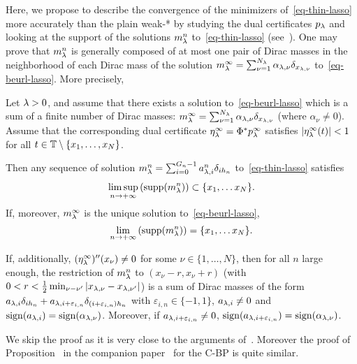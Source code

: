 Here, we propose to describe the convergence of the minimizers of~\eqref{eq-thin-lasso} more accurately than the plain weak-* by studying the dual certificates $p_\lambda$ and looking at the support of the solutions $m_\lambda^n$ to~\eqref{eq-thin-lasso} (see~\cite[Section~5.4]{2013-duval-sparsespikes}). One may prove that $m_\lambda^n$ is generally composed of at most one pair of Dirac masses in the neighborhood of each Dirac mass of the solution $m_{\lambda}^\infty=\sum_{\nu=1}^{N_\lambda} \alpha_{\lambda,\nu}\delta_{x_{\lambda,\nu}}$ to~\eqref{eq-beurl-lasso}. More precisely, 
\begin{prop}
  Let $\lambda >0$, and assume that there exists a solution to~\eqref{eq-beurl-lasso} which is a sum of a finite number of Dirac masses: $m_{\lambda}^\infty=\sum_{\nu=1}^{N_\lambda} \alpha_{\lambda,\nu}\delta_{x_{\lambda,\nu}}$ (where $\alpha_\nu\neq 0$). Assume that the corresponding dual certificate $\eta_\lambda^{\infty}=\Phi^*p_{\lambda}^\infty$ satisfies $|\eta_\lambda^\infty(t)|<1$ for all $t\in \mathbb{T}\setminus \{x_1,\ldots ,x_N \}$.
    
  Then any sequence of solution $m_{\lambda}^n=\sum_{i=0}^{{G_n}-1} a^n_{\lambda,i} \delta_{i{h_n}}$ to~\eqref{eq-thin-lasso} satisfies 
  \begin{align*}
    \limsup_{n\to+\infty}\left(\operatorname{supp}(m_{\lambda}^n)\right)\subset \{x_1, \ldots x_N\}.
  \end{align*}
  If, moreover, $m_{\lambda}^\infty$ is the unique solution to~\eqref{eq-beurl-lasso}, 
  \begin{align}
    \lim_{n\to+\infty}\left(\operatorname{supp}(m_{\lambda}^n)\right)= \{x_1, \ldots x_N\}.
  \end{align}

  If, additionally, $(\eta_\lambda^{\infty})''(x_\nu)\neq 0$ for some $\nu \in\{1,\ldots,N\}$, then for all $n$ large enough, the restriction of $m_{\lambda}^{n}$ to $(x_\nu-r,x_\nu+r)$ (with $0<r<\frac{1}{2} \min_{\nu-\nu'}|x_{\lambda,\nu}-x_{\lambda,\nu'}|$) is a sum of Dirac masses of the form $ a_{\lambda,i}\delta_{i{h_n}}+ a_{\lambda,i+\varepsilon_{i,n}}\delta_{(i+\varepsilon_{i,n}){h_n}}$ with $\varepsilon_{i,n}\in\{-1,1\}$, $a_{\lambda,i}\neq 0$ and $\operatorname{sign}(a_{\lambda,i})=\operatorname{sign}(\alpha_{\lambda,\nu})$. Moreover, if $a_{\lambda,i+\varepsilon_{i,n}}\neq 0$, $\operatorname{sign}(a_{\lambda,i+\varepsilon_{i,n}})=\operatorname{sign}(\alpha_{\lambda,\nu})$.
\end{prop}

We skip the proof as it is very close to the arguments of~\cite[Section~5.4]{2013-duval-sparsespikes}. Moreover the proof of Proposition~\CitationProp{} in the companion paper~\cite{2016-duval-thincbp} for the C-BP is quite similar.


